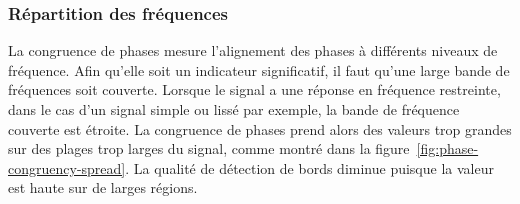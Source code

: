 \subsubsection{Répartition des fréquences}

La congruence de phases mesure l'alignement des phases à différents niveaux de fréquence. Afin qu'elle soit un indicateur significatif, il faut qu'une large bande de fréquences soit couverte. Lorsque le signal a une réponse en fréquence restreinte, dans le cas d'un signal simple ou lissé par exemple, la bande de fréquence couverte est étroite. La congruence de phases prend alors des valeurs trop grandes sur des plages trop larges du signal, comme montré dans la figure~\ref{fig:phase-congruency-spread}. La qualité de détection de bords diminue puisque la valeur est haute sur de larges régions.

\bigskip

